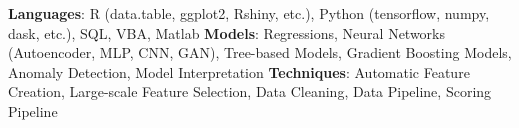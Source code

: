 

\begin{cvparagraph}
{\textbf{Languages}: R (data.table, ggplot2, Rshiny, etc.), Python (tensorflow, numpy, dask, etc.), SQL, VBA, Matlab}\newline
{\textbf{Models}: Regressions, Neural Networks (Autoencoder, MLP, CNN, GAN), Tree-based Models, Gradient Boosting Models, Anomaly Detection, Model Interpretation}\newline
{\textbf{Techniques}: Automatic Feature Creation, Large-scale Feature Selection, Data Cleaning, Data Pipeline, Scoring Pipeline}
\end{cvparagraph}

